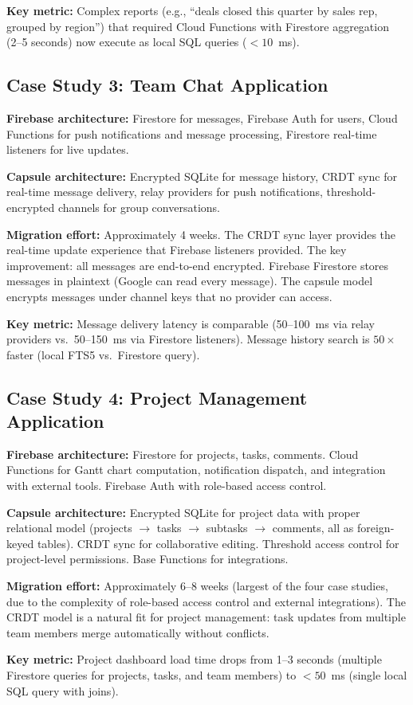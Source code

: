 \textbf{Key metric:} Complex reports (e.g., ``deals closed this quarter
by sales rep, grouped by region'') that required Cloud Functions with
Firestore aggregation (2--5 seconds) now execute as local SQL queries
($<10$~ms).

\subsection{Case Study 3: Team Chat Application}

\textbf{Firebase architecture:} Firestore for messages, Firebase Auth
for users, Cloud Functions for push notifications and message
processing, Firestore real-time listeners for live updates.

\textbf{Capsule architecture:} Encrypted SQLite for message history,
CRDT sync for real-time message delivery, relay providers for push
notifications, threshold-encrypted channels for group conversations.

\textbf{Migration effort:} Approximately 4 weeks. The CRDT sync layer
provides the real-time update experience that Firebase listeners provided.
The key improvement: all messages are end-to-end encrypted. Firebase
Firestore stores messages in plaintext (Google can read every message).
The capsule model encrypts messages under channel keys that no provider
can access.

\textbf{Key metric:} Message delivery latency is comparable (50--100~ms
via relay providers vs.\ 50--150~ms via Firestore listeners). Message
history search is $50\times$ faster (local FTS5 vs.\ Firestore query).

\subsection{Case Study 4: Project Management Application}

\textbf{Firebase architecture:} Firestore for projects, tasks, comments.
Cloud Functions for Gantt chart computation, notification dispatch,
and integration with external tools. Firebase Auth with role-based
access control.

\textbf{Capsule architecture:} Encrypted SQLite for project data with
proper relational model (projects $\to$ tasks $\to$ subtasks $\to$ comments,
all as foreign-keyed tables). CRDT sync for collaborative editing.
Threshold access control for project-level permissions. Base Functions
for integrations.

\textbf{Migration effort:} Approximately 6--8 weeks (largest of the four
case studies, due to the complexity of role-based access control and
external integrations). The CRDT model is a natural fit for project
management: task updates from multiple team members merge automatically
without conflicts.

\textbf{Key metric:} Project dashboard load time drops from 1--3 seconds
(multiple Firestore queries for projects, tasks, and team members) to
$<50$~ms (single local SQL query with joins).

